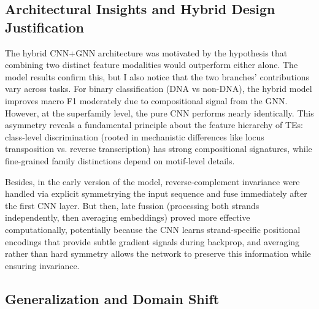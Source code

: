 \documentclass[12pt]{article}
\begin{document}
\subsection{Architectural Insights and Hybrid Design Justification}

The hybrid CNN+GNN architecture was motivated by the hypothesis that combining two distinct feature modalities would outperform either alone. The model results confirm this, but I also notice that the two branches' contributions vary across tasks. For binary classification (DNA vs non-DNA), the hybrid model improves macro F1 moderately due to compositional signal from the GNN. However, at the superfamily level, the pure CNN performs nearly identically. This asymmetry reveals a fundamental principle about the feature hierarchy of TEs: class-level discrimination (rooted in mechanistic differences like locus transposition vs. reverse transcription) has strong compositional signatures, while fine-grained family distinctions depend on motif-level details. 


Besides, in the early version of the model, reverse-complement invariance were handled via explicit symmetrying the input sequence and fuse immediately after the first CNN layer. But then, late fussion (processing both strands independently, then averaging embeddings) proved more effective computationally, potentially because the CNN learns strand-specific positional encodings that provide subtle gradient signals during backprop, and averaging rather than hard symmetry allows the network to preserve this information while ensuring invariance. 

\subsection{Generalization and Domain Shift}
\end{document}
